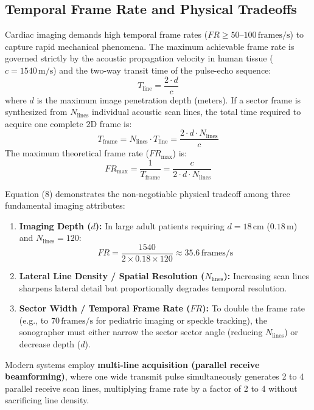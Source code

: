 \documentclass[11pt,a4paper]{article}
\begin{document}
\subsection{Temporal Frame Rate and Physical Tradeoffs}

Cardiac imaging demands high temporal frame rates ($FR \ge 50\text{--}100\,\text{frames/s}$) to capture rapid mechanical phenomena. The maximum achievable frame rate is governed strictly by the acoustic propagation velocity in human tissue ($c = 1540\,\text{m/s}$) and the two-way transit time of the pulse-echo sequence:
\begin{equation}
    T_{\text{line}} = \frac{2 \cdot d}{c}
\end{equation}
where $d$ is the maximum image penetration depth ($\text{meters}$). If a sector frame is synthesized from $N_{\text{lines}}$ individual acoustic scan lines, the total time required to acquire one complete 2D frame is:
\begin{equation}
    T_{\text{frame}} = N_{\text{lines}} \cdot T_{\text{line}} = \frac{2 \cdot d \cdot N_{\text{lines}}}{c}
\end{equation}
The maximum theoretical frame rate ($FR_{\text{max}}$) is:
\begin{equation}
    FR_{\text{max}} = \frac{1}{T_{\text{frame}}} = \frac{c}{2 \cdot d \cdot N_{\text{lines}}}
\end{equation}

\begin{physicsbox}
Equation (8) demonstrates the non-negotiable physical tradeoff among three fundamental imaging attributes:
\begin{enumerate}[leftmargin=*]
    \item \textbf{Imaging Depth ($d$):} In large adult patients requiring $d = 18\,\text{cm}$ ($0.18\,\text{m}$) and $N_{\text{lines}} = 120$:
    \begin{equation}
        FR = \frac{1540}{2 \times 0.18 \times 120} \approx 35.6\,\text{frames/s}
    \end{equation}
    \item \textbf{Lateral Line Density / Spatial Resolution ($N_{\text{lines}}$):} Increasing scan lines sharpens lateral detail but proportionally degrades temporal resolution.
    \item \textbf{Sector Width / Temporal Frame Rate ($FR$):} To double the frame rate (e.g., to $70\,\text{frames/s}$ for pediatric imaging or speckle tracking), the sonographer must either narrow the sector sector angle (reducing $N_{\text{lines}}$) or decrease depth ($d$).
\end{enumerate}
Modern systems employ \textbf{multi-line acquisition (parallel receive beamforming)}, where one wide transmit pulse simultaneously generates 2 to 4 parallel receive scan lines, multiplying frame rate by a factor of 2 to 4 without sacrificing line density.
\end{physicsbox}
\end{document}
